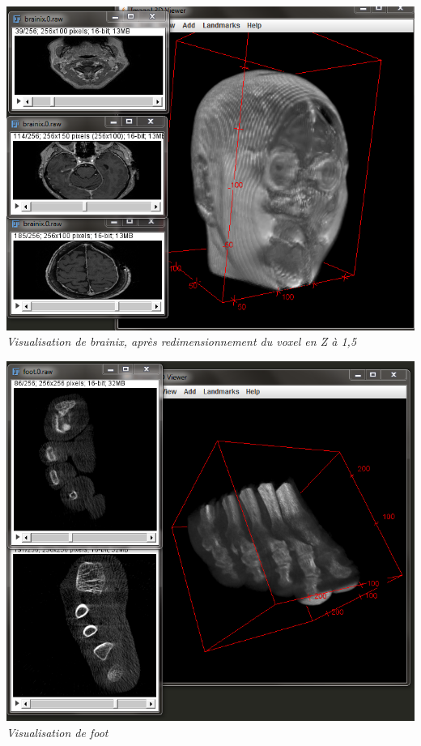 \documentclass[a4paper,11pt]{article}
\begin{document}
\begin{center}
\includegraphics[scale=0.6]{brainixFait.png}\\
\textit{Visualisation de brainix, après redimensionnement du voxel en Z à 1,5}
\end{center}

\begin{center}
\includegraphics[scale=0.6]{footixFait.png}\\
\textit{Visualisation de foot}
\end{center}
\end{document}
